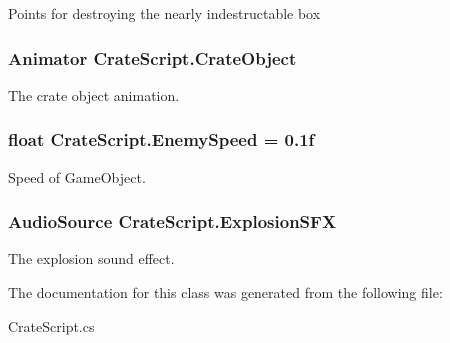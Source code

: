 Points for destroying the nearly indestructable box 

\hypertarget{classCrateScript_a7bcc293c9a36061d47c14c675126329f}{
\subsubsection[{Crate\-Object}]{\setlength{\rightskip}{0pt plus 5cm}Animator Crate\-Script.\-Crate\-Object}}\label{classCrateScript_a7bcc293c9a36061d47c14c675126329f}


The crate object animation. 

\hypertarget{classCrateScript_a60ff5faecd26f04a37351e1de67019b5}{
\subsubsection[{Enemy\-Speed}]{\setlength{\rightskip}{0pt plus 5cm}float Crate\-Script.\-Enemy\-Speed = 0.\-1f}}\label{classCrateScript_a60ff5faecd26f04a37351e1de67019b5}


Speed of Game\-Object. 

\hypertarget{classCrateScript_aa70bfd5d4f2f1479df22928a5c085f56}{
\subsubsection[{Explosion\-S\-F\-X}]{\setlength{\rightskip}{0pt plus 5cm}Audio\-Source Crate\-Script.\-Explosion\-S\-F\-X}}\label{classCrateScript_aa70bfd5d4f2f1479df22928a5c085f56}


The explosion sound effect. 



The documentation for this class was generated from the following file\-:\begin{DoxyCompactItemize}
\item 
Crate\-Script.\-cs\end{DoxyCompactItemize}
